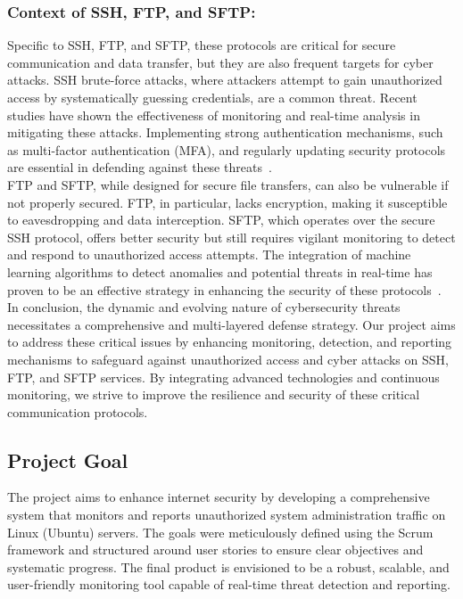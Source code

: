\documentclass{article}
\begin{document}
    \subsubsection{Context of SSH, FTP, and SFTP:}
    Specific to SSH, FTP, and SFTP, these protocols are critical for secure communication and data transfer, but they are also frequent targets for cyber attacks.
    SSH brute-force attacks, where attackers attempt to gain unauthorized access by systematically guessing credentials, are a common threat.
    Recent studies have shown the effectiveness of monitoring and real-time analysis in mitigating these attacks.
    Implementing strong authentication mechanisms, such as multi-factor authentication (MFA), and regularly updating security protocols are essential in defending against these threats~\cite{talos2024, securityweek2024, cyberpress2024}.\\

    \noindent FTP and SFTP, while designed for secure file transfers, can also be vulnerable if not properly secured.
    FTP, in particular, lacks encryption, making it susceptible to eavesdropping and data interception.
    SFTP, which operates over the secure SSH protocol, offers better security but still requires vigilant monitoring to detect and respond to unauthorized access attempts.
    The integration of machine learning algorithms to detect anomalies and potential threats in real-time has proven to be an effective strategy in enhancing the security of these protocols~\cite{sucuri2024}.\\

    \noindent In conclusion, the dynamic and evolving nature of cybersecurity threats necessitates a comprehensive and multi-layered defense strategy.
    Our project aims to address these critical issues by enhancing monitoring, detection, and reporting mechanisms to safeguard against unauthorized access and cyber attacks on SSH, FTP, and SFTP services. By integrating advanced technologies and continuous monitoring, we strive to improve the resilience and security of these critical communication protocols.

    \subsection{Project Goal}\label{subsec:project-goal}
    The project aims to enhance internet security by developing a comprehensive system that monitors and reports unauthorized system administration traffic on Linux (Ubuntu) servers.
    The goals were meticulously defined using the Scrum framework and structured around user stories to ensure clear objectives and systematic progress.
    The final product is envisioned to be a robust, scalable, and user-friendly monitoring tool capable of real-time threat detection and reporting.
\end{document}

